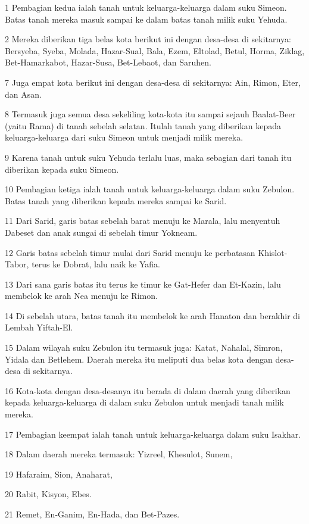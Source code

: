 \par 1 Pembagian kedua ialah tanah untuk keluarga-keluarga dalam suku Simeon. Batas tanah mereka masuk sampai ke dalam batas tanah milik suku Yehuda.
\par 2 Mereka diberikan tiga belas kota berikut ini dengan desa-desa di sekitarnya: Bersyeba, Syeba, Molada, Hazar-Sual, Bala, Ezem, Eltolad, Betul, Horma, Ziklag, Bet-Hamarkabot, Hazar-Susa, Bet-Lebaot, dan Saruhen.
\par 7 Juga empat kota berikut ini dengan desa-desa di sekitarnya: Ain, Rimon, Eter, dan Asan.
\par 8 Termasuk juga semua desa sekeliling kota-kota itu sampai sejauh Baalat-Beer (yaitu Rama) di tanah sebelah selatan. Itulah tanah yang diberikan kepada keluarga-keluarga dari suku Simeon untuk menjadi milik mereka.
\par 9 Karena tanah untuk suku Yehuda terlalu luas, maka sebagian dari tanah itu diberikan kepada suku Simeon.
\par 10 Pembagian ketiga ialah tanah untuk keluarga-keluarga dalam suku Zebulon. Batas tanah yang diberikan kepada mereka sampai ke Sarid.
\par 11 Dari Sarid, garis batas sebelah barat menuju ke Marala, lalu menyentuh Dabeset dan anak sungai di sebelah timur Yokneam.
\par 12 Garis batas sebelah timur mulai dari Sarid menuju ke perbatasan Khislot-Tabor, terus ke Dobrat, lalu naik ke Yafia.
\par 13 Dari sana garis batas itu terus ke timur ke Gat-Hefer dan Et-Kazin, lalu membelok ke arah Nea menuju ke Rimon.
\par 14 Di sebelah utara, batas tanah itu membelok ke arah Hanaton dan berakhir di Lembah Yiftah-El.
\par 15 Dalam wilayah suku Zebulon itu termasuk juga: Katat, Nahalal, Simron, Yidala dan Betlehem. Daerah mereka itu meliputi dua belas kota dengan desa-desa di sekitarnya.
\par 16 Kota-kota dengan desa-desanya itu berada di dalam daerah yang diberikan kepada keluarga-keluarga di dalam suku Zebulon untuk menjadi tanah milik mereka.
\par 17 Pembagian keempat ialah tanah untuk keluarga-keluarga dalam suku Isakhar.
\par 18 Dalam daerah mereka termasuk: Yizreel, Khesulot, Sunem,
\par 19 Hafaraim, Sion, Anaharat,
\par 20 Rabit, Kisyon, Ebes.
\par 21 Remet, En-Ganim, En-Hada, dan Bet-Pazes.
